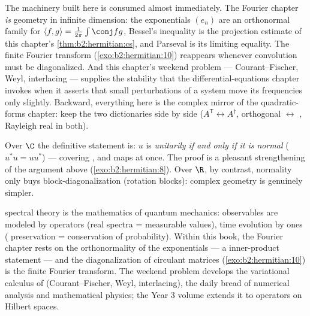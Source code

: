 \begin{remark}
The  machinery built here is consumed almost
immediately. The Fourier chapter \emph{is}  geometry
in infinite dimension: the exponentials $(e_n)$ are an
orthonormal family for $\langle f, g\rangle =
\frac{1}{2\pi}\int\conj fg$, Bessel's inequality is the
projection estimate of this chapter's
\cref{thm:b2:hermitian:cs}, and Parseval is its limiting
equality. The finite Fourier transform
(\cref{exo:b2:hermitian:10}) reappears whenever convolution
must be diagonalized. And this chapter's weekend problem ---
Courant--Fischer, Weyl, interlacing --- supplies the
 stability that the differential-equations chapter
invokes when it asserts that small perturbations of a system
move its frequencies only slightly. Backward, everything here
is the complex mirror of the quadratic-forms chapter: keep the
two dictionaries side by side ($A^{\mathsf T} \leftrightarrow
A^\dagger$, orthogonal $\leftrightarrow$ , Rayleigh
real in both).
\end{remark}

\begin{remark}
Over $\C$ the definitive statement is: $u$ is \emph{unitarily
 if and only if it is normal} ($u^*u = uu^*$) ---
covering ,  and  maps at once. The
proof is a pleasant strengthening of the argument above
(\cref{exo:b2:hermitian:8}). Over $\R$, by contrast, normality only
buys block-diagonalization (rotation blocks): complex geometry is
genuinely simpler.
\end{remark}

\begin{remark}
 spectral theory is the mathematics of quantum
mechanics: observables are modeled by  operators
(real spectra = measurable values), time evolution by 
ones ( preservation = conservation of probability). Within
this book, the Fourier chapter rests on the orthonormality of
the exponentials --- a  inner-product statement --- and
the diagonalization of circulant matrices
(\cref{exo:b2:hermitian:10}) is the finite Fourier transform.
The weekend problem develops the variational calculus of
 (Courant--Fischer, Weyl, interlacing), the daily
bread of numerical analysis and mathematical physics; the Year
3 volume extends it to   operators on
Hilbert spaces.
\end{remark}

